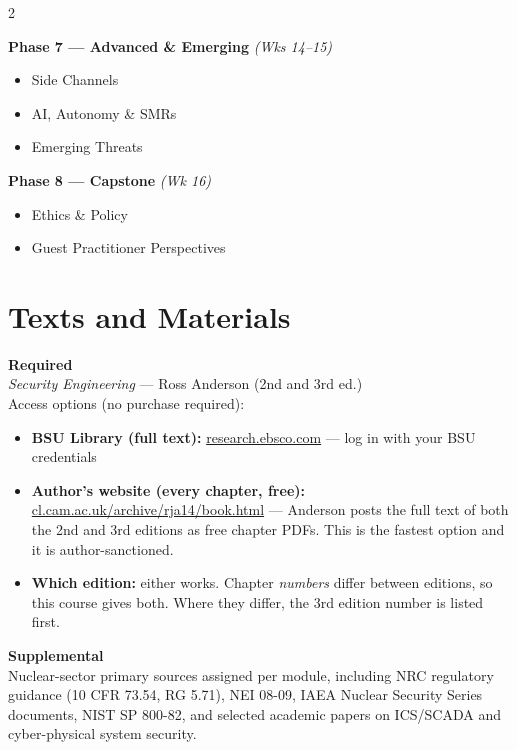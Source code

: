 \documentclass[9pt]{extarticle}
\begin{document}
\begin{multicols}{2}
{\medskip

\textbf{Phase 7 --- Advanced \& Emerging} \textit{(Wks 14--15)}
\begin{itemize}
    \item Side Channels
    \item AI, Autonomy \& SMRs
    \item Emerging Threats
\end{itemize}

\medskip

\textbf{Phase 8 --- Capstone} \textit{(Wk 16)}
\begin{itemize}
    \item Ethics \& Policy
    \item Guest Practitioner Perspectives
\end{itemize}
}

\end{multicols}

\newpage
\section*{Texts and Materials}

\textbf{Required} \\
\textit{Security Engineering} --- Ross Anderson (2nd and 3rd ed.) \\
Access options (no purchase required):
\begin{itemize}
    \item \textbf{BSU Library (full text):} \href{https://research.ebsco.com/c/fzqa7n/search/details/oetacepj7f?q=security+engineering}{research.ebsco.com} --- log in with your BSU credentials
    \item \textbf{Author's website (every chapter, free):} \href{https://www.cl.cam.ac.uk/archive/rja14/book.html}{cl.cam.ac.uk/archive/rja14/book.html} --- Anderson posts the full text of both the 2nd and 3rd editions as free chapter PDFs. This is the fastest option and it is author-sanctioned.
    \item \textbf{Which edition:} either works. Chapter \emph{numbers} differ between editions, so this course gives both. Where they differ, the 3rd edition number is listed first.
\end{itemize}

\medskip

\textbf{Supplemental} \\
Nuclear-sector primary sources assigned per module, including NRC regulatory
guidance (10 CFR 73.54, RG 5.71), NEI 08-09, IAEA Nuclear Security Series
documents, NIST SP 800-82, and selected academic papers on ICS/SCADA and
cyber-physical system security.
\end{document}
